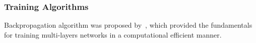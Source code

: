 \subsubsection{Training Algorithms}
Backpropagation algorithm was proposed by~\citet{werbos1975beyond}, which provided the fundamentals for training multi-layers networks in a computational efficient manner. 